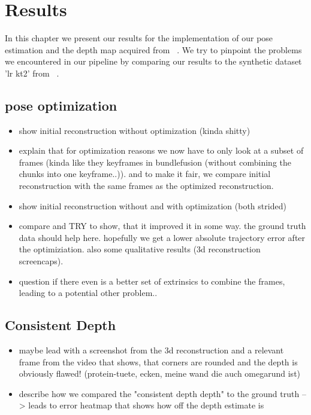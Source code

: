 \chapter{Results}
    In this chapter we present our results for the implementation of our pose estimation and the depth map acquired from ~\cite{luo2020consistent}.
    We try to pinpoint the problems we encountered in our pipeline by comparing our results to the synthetic dataset 'lr kt2' from ~\cite{handa:etal:ICRA2014}.
    \section{pose optimization}
        \begin{itemize}
            \item show initial reconstruction without optimization (kinda shitty)
            \item explain that for optimization reasons we now have to only look at a subset of frames (kinda like they keyframes in bundlefusion (without combining the chunks into one keyframe..)). and to make it fair, we compare initial reconstruction with the same frames as the optimized reconstruction.
            \item show initial reconstruction without and with optimization (both strided)
            \item compare and TRY to show, that it improved it in some way. the ground truth data should help here. hopefully we get a lower absolute trajectory error after the optimiziation. also some qualitative results (3d reconstruction screencaps).
            \item question if there even is a better set of extrinsics to combine the frames, leading to a potential other problem..
        \end{itemize}
    \section{Consistent Depth}
        \begin{itemize}
            \item maybe lead with a screenshot from the 3d reconstruction and a relevant frame from the video that shows, that corners are rounded and the depth is obviously flawed! (protein-tuete, ecken, meine wand die auch omegarund ist)
            \item describe how we compared the "consistent depth depth" to the ground truth --> leads to error heatmap that shows how off the depth estimate is
        \end{itemize}